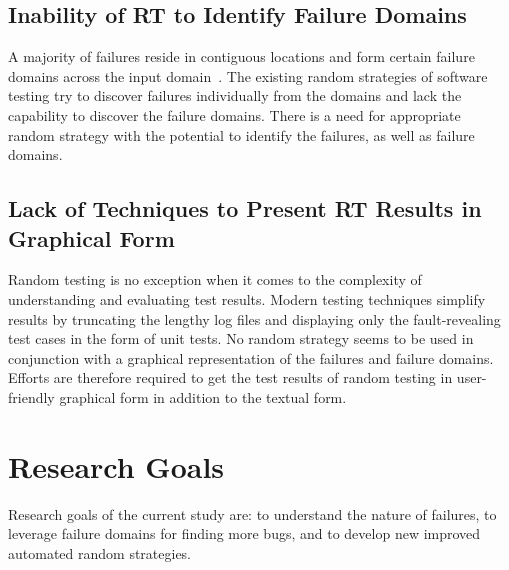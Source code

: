 \subsection{Inability of RT to Identify Failure Domains}
A majority of failures reside in contiguous locations and form certain failure domains across the input domain~\cite{chan1996proportional}. The existing random strategies of software testing try to discover failures individually from the domains and lack the capability to discover the failure domains. There is a need for appropriate random strategy with the potential to identify the failures, as well as failure domains. 


\subsection{Lack of Techniques to Present RT Results in Graphical Form}
Random testing is no exception when it comes to the complexity of understanding and evaluating test results. Modern testing techniques simplify results by truncating the lengthy log files and displaying only the fault-revealing test cases in the form of unit tests. No random strategy seems to be used in conjunction with a graphical representation of the failures and failure domains. Efforts are therefore required to get the test results of random testing in user-friendly graphical form in addition to the textual form. 






\section{Research Goals}\label{ResearchGoals_1}
Research goals of the current study are: to understand the nature of failures, to leverage failure domains for finding more bugs, and to develop new improved automated random strategies.


